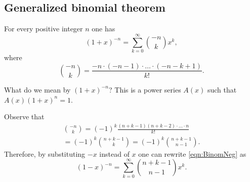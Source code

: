 \begin{page}
\setcounter{section}{2}
\setcounter{subsection}{4}
\setcounter{dfn}{12}
\label{portion:763}

\subsection{Generalized binomial theorem}


\end{page}

\begin{page}
\setcounter{section}{2}
\setcounter{subsection}{4}
\setcounter{dfn}{13}
\label{portion:765}

\begin{thm}
\label{thm:BinomNeg}
For every positive integer $n$ one has
\begin{equation}
\label{eqn:BinomNeg}
(1+x)^{-n} = \sum_{k=0}^\infty \binom{-n}{k} x^k,
\end{equation}
where
\[
\binom{-n}{k} = \frac{-n \cdot (-n-1) \cdot \ldots \cdot (-n-k+1)}{k!}.
\]
\end{thm}

\end{page}

\begin{page}
\setcounter{section}{2}
\setcounter{subsection}{4}
\setcounter{dfn}{13}
\label{portion:766}


What do we mean by $(1+x)^{-n}$?
This is a power series $A(x)$ such that $A(x) (1+x)^n = 1$.


\end{page}

\begin{page}
\setcounter{section}{2}
\setcounter{subsection}{4}
\setcounter{dfn}{14}
\label{portion:768}

\begin{rem}
Observe that
\begin{multline*}
\binom{-n}{k} = (-1)^k \frac{(n+k-1) (n+k-2) \cdot \ldots \cdot n}{k!}\\
= (-1)^k \binom{n+k-1}{k} = (-1)^k \binom{n+k-1}{n-1}.
\end{multline*}
Therefore, by substituting $-x$ instead of $x$ one can rewrite \eqref{eqn:BinomNeg} as
\[
(1-x)^{-n} = \sum_{k=0}^\infty \binom{n+k-1}{n-1} x^k.
\]
\end{rem}

\end{page}

